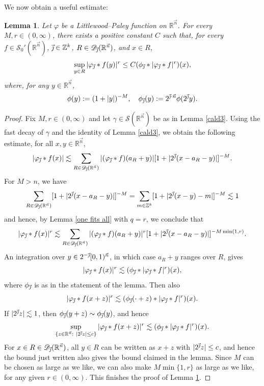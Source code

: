 \documentclass[11pt, reqno]{amsart}
\newtheorem{lemma}[theorem]{Lemma}
\theoremstyle{definition}
\theoremstyle{remark}
\numberwithin{equation}{section}
\newcommand{\D}{\mathscr D}
\newcommand{\R}{\mathbb R}
\newcommand{\Sc}{\mathscr S}
\newcommand{\Z}{\mathbb Z}
\newcommand{\vj}{\vec{\textit{\j}}}
\newcommand{\vn}{\vec n}
\newcommand{\abs}[1]{|#1|}
\begin{document}
We now obtain a useful estimate:

\begin{lemma}\label{cald4}
Let $\varphi$ be a Littlewood--Paley function on $\R^{\vn}$.
For every $M,r\in(0,\infty)$, there exists a positive constant $C$
such that, for every $f\in\Sc_0'(\R^{\vn})$, $\vj\in\Z^k$,
$R\in\D_{\vj}(\R^{\vn})$, and $x\in R$,
\begin{equation*}
\sup_{y\in R}\abs{\varphi_{\vj}*f(y)}^r\leq C(\phi_{\vj}*\abs{\varphi_{\vj}*f}^r)(x),
\end{equation*}
where, for any $y\in\R^{\vn}$,
\begin{equation}\label{cald40}
\phi(y):=(1+\abs{y})^{-M},\quad\phi_{\vj}(y):=2^{\vj\cdot\vn}\phi(2^{\vj}y).
\end{equation}
\end{lemma}

\begin{proof}
Fix $M,r\in(0,\infty)$ and let $\gamma\in\Sc(\R^{\vn})$ be as in Lemma \ref{cald3}.
Using the fast decay of $\gamma$
and the identity of Lemma \ref{cald3},
we obtain the following estimate, for all $x,y\in\mathbb R^{\vn}$,
\begin{equation}\label{cald41}
\abs{\varphi_{\vj}*f(x)}
\lesssim\sum_{R\in\D_{\vj}(\R^{\vn})}\abs{(\varphi_{\vj}*f)(a_R+y)} [1+\abs{2^{\vj}(x-a_R-y)}]^{-M}.
\end{equation}
For $M>n$, we have
\begin{equation*}
\sum_{R\in\D_{\vj}(\R^{\vn})} [1+\abs{2^{\vj}(x-a_R-y)}]^{-M}
=\sum_{m\in\Z^k}[1+\abs{2^{\vj}(x-y)-m}]^{-M}\lesssim 1
\end{equation*}
and hence, by Lemma \ref{one fits all} with $q=r$, we conclude that
\begin{equation*}
\abs{\varphi_{\vj}*f(x)}^r
\lesssim\sum_{R\in\D_{\vj}(\R^{\vn})}\abs{(\varphi_{\vj}*f)(a_R+y)}^r [1+\abs{2^{\vj}(x-a_R-y)}]^{-M\min(1,r)}.
\end{equation*}
An integration over $y\in 2^{-\vj}[0,1)^{\vn}$, in which case $a_R+y$ ranges over $R$, gives
\begin{equation*}
\abs{\varphi_{\vj}*f(x)}^r
\lesssim(\phi_{\vj}*\abs{\varphi_{\vj}*f}^r)(x),
\end{equation*}
where $\phi_{\vj}$ is as in the statement of the lemma.
Then also
\begin{equation*}
\abs{\varphi_{\vj}*f(x+z)}^r
\lesssim(\phi_{\vj}(\cdot+z)*\abs{\varphi_{\vj}*f}^r)(x).
\end{equation*}
If $\abs{2^{\vj}z}\lesssim 1$, then $\phi_{\vj}(y+z)\sim\phi_{\vj}(y)$, and hence
\begin{equation*}
\sup_{\{z\in\R^{\vn}:\ \abs{2^{\vj}z}\leq c\}}\abs{\varphi_{\vj}*f(x+z)}^r\lesssim (\phi_{\vj}*\abs{\varphi_{\vj}*f}^r)(x).
\end{equation*}
For $x\in R\in\D_{\vj}(\R^{\vn})$, all $y\in R$ can be written as $x+z$ with $\abs{2^{\vj}z}\leq c$, and hence the bound just written also gives the bound claimed in the lemma. Since $M$ can be chosen as large as we like, we can also make $M\min\{1,r\}$ as large as we like, for any given $r\in(0,\infty)$.
This finishes the proof of Lemma \ref{cald4}.
\end{proof}
\end{document}
